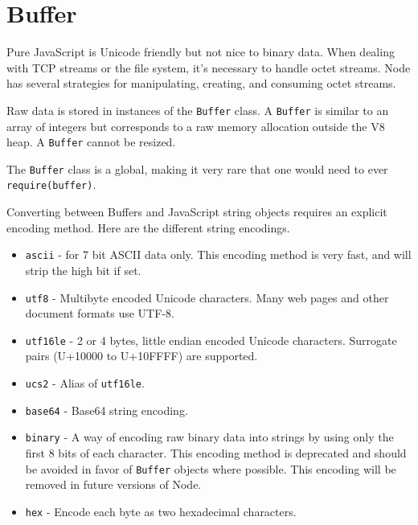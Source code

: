 \section{Buffer}\label{buffer}

\begin{Shaded}
\begin{Highlighting}[]
 
\end{Highlighting}
\end{Shaded}

Pure JavaScript is Unicode friendly but not nice to binary data. When
dealing with TCP streams or the file system, it's necessary to handle
octet streams. Node has several strategies for manipulating, creating,
and consuming octet streams.

Raw data is stored in instances of the \texttt{Buffer} class. A
\texttt{Buffer} is similar to an array of integers but corresponds to a
raw memory allocation outside the V8 heap. A \texttt{Buffer} cannot be
resized.

The \texttt{Buffer} class is a global, making it very rare that one
would need to ever
\texttt{require(\textquotesingle{}buffer\textquotesingle{})}.

Converting between Buffers and JavaScript string objects requires an
explicit encoding method. Here are the different string encodings.

\begin{itemize}
\item
  \texttt{\textquotesingle{}ascii\textquotesingle{}} - for 7 bit ASCII
  data only. This encoding method is very fast, and will strip the high
  bit if set.
\item
  \texttt{\textquotesingle{}utf8\textquotesingle{}} - Multibyte encoded
  Unicode characters. Many web pages and other document formats use
  UTF-8.
\item
  \texttt{\textquotesingle{}utf16le\textquotesingle{}} - 2 or 4 bytes,
  little endian encoded Unicode characters. Surrogate pairs (U+10000 to
  U+10FFFF) are supported.
\item
  \texttt{\textquotesingle{}ucs2\textquotesingle{}} - Alias of
  \texttt{\textquotesingle{}utf16le\textquotesingle{}}.
\item
  \texttt{\textquotesingle{}base64\textquotesingle{}} - Base64 string
  encoding.
\item
  \texttt{\textquotesingle{}binary\textquotesingle{}} - A way of
  encoding raw binary data into strings by using only the first 8 bits
  of each character. This encoding method is deprecated and should be
  avoided in favor of \texttt{Buffer} objects where possible. This
  encoding will be removed in future versions of Node.
\item
  \texttt{\textquotesingle{}hex\textquotesingle{}} - Encode each byte as
  two hexadecimal characters.
\end{itemize}

